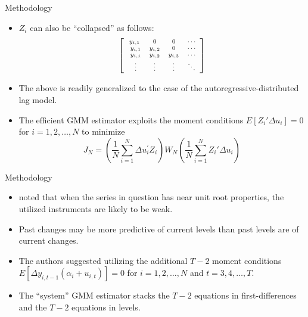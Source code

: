 \documentclass[xcolor=dvipsnames]{beamer}
\begin{document}
\begin{frame}{Methodology}
\begin{itemize}
\item $Z_i$ can also be ``collapsed'' as follows:
\begin{equation*}
\left[ 
\scriptsize
\begin{array}{ccccccc}
y_{i,1} & 0 & 0 & \cdots   \\\
y_{i,1} & y_{i,2} & 0 & \cdots   \\\
y_{i,1} & y_{i,2} & y_{i,3} & \cdots  \\\
\vdots & \vdots & \vdots & \ddots
\end{array}
\right]
\end{equation*}
\par\pause\noindent \item The above is readily generalized to the case 
of the autoregressive-distributed lag model.
\par\pause\noindent \item The efficient GMM estimator exploits the 
moment conditions $E[Z_i' \Delta u_i]=0$ for $i=1,2,\ldots,N$ to 
minimize
\begin{equation*}
J_N = \left(\frac{1}{N} \sum_{i=1}^N \Delta u_{i}^{\prime} Z_i \right) 
W_N \left(\frac{1}{N} \sum _{i=1}^N Z_i' \Delta u_i\right)
\end{equation*}
\end{itemize}
\end{frame}

\begin{frame}{Methodology}
\begin{itemize}
\item \citet{blundell1998} noted that when the series in question has near 
unit root properties, the utilized instruments are likely to be weak.
\par\pause\noindent \item Past changes may be more predictive of current 
levels than past levels are of current changes.
\par\pause\noindent \item The authors suggested utilizing the additional 
$T-2$ moment conditions $E[\Delta y_{i,t-1} (\alpha_i + u_{i,t})]=0$ 
for $i=1,2,\ldots,N$ and $t=3,4,\ldots,T$.
\par\pause\noindent \item The ``system'' GMM estimator stacks the 
$T-2$ equations in first-differences and the $T-2$ equations in levels.
\end{itemize}
\end{frame}
\end{document}

